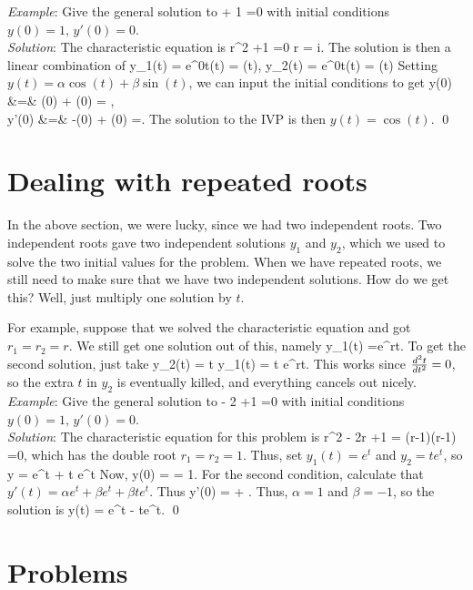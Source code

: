 \documentclass[12pt]{book}
\begin{document}
\noindent\emph{Example}: Give the general solution to
\bee
{} + 1 =0
\eee
with initial conditions $y(0) =1, \, y'(0) =0.$\\
\noindent\emph{Solution}:
The characteristic equation is
\bee
r^2 +1 =0 \quad \implies \quad r = \pm i.
\eee
The solution is then a linear combination of
\bee
y_1(t) = e^{0t}\cos(t) = \cos(t), \qquad
y_2(t) = e^{0t}\sin(t) = \sin(t)
\eee
Setting $y(t)=\alpha \cos(t) + \beta \sin(t)$, we can input the initial
conditions to get
\bee
y(0) &=& \alpha\cos(0) + \beta\sin(0) = ,
\\
y'(0) &=& -\alpha\sin(0) + \beta\cos(0) =.
\eee
The solution to the IVP is then $y(t) = \cos(t)$. \qed

\section{Dealing with repeated roots}
In the above section, we were lucky, since we had two independent roots.
Two independent roots gave two independent solutions $y_1$ and $y_2$, which
we used to solve the two initial values for the problem. When we have
repeated roots, we still need to make sure that we have two independent
solutions. How do we get this? Well, just multiply one solution by $t$.

For example, suppose that we solved the characteristic equation and got
$r_1=r_2=r$. We still get one solution out of this, namely
\bee
y_1(t) =e^{rt}.
\eee
To get the second solution, just take
\bee
y_2(t) = t y_1(t) = t e^{rt}.
\eee
This works since $\frac{d^2 t}{d t^2}=0$, so the extra $t$ in $y_2$ is eventually
killed, and everything cancels out nicely.
\\

\noindent\emph{Example}: Give the general solution to
\bee
{} - 2 +1 =0
\eee
with initial conditions $y(0) =1, \, y'(0) =0.$\\
\noindent\emph{Solution}:
The characteristic equation for this problem is
\bee
r^2 - 2r +1 = (r-1)(r-1) =0,
\eee
which has the double root $r_1=r_2=1$. Thus, set
$y_1(t) = e^t$ and $y_2=t e^t$, so
\bee
y = \alpha e^t + \beta t e^t
\eee
Now,
\bee
y(0) = \alpha = 1.
\eee
For the second condition, calculate that
$y'(t) = \alpha e^t + \beta e^t + \beta te^t$. Thus
\bee
y'(0) = \alpha + .
\eee
Thus, $\alpha=1$ and $\beta =-1$, so the solution is
\bee
y(t) = e^t - te^t. \qed
\eee


\section{Problems}
\end{document}
